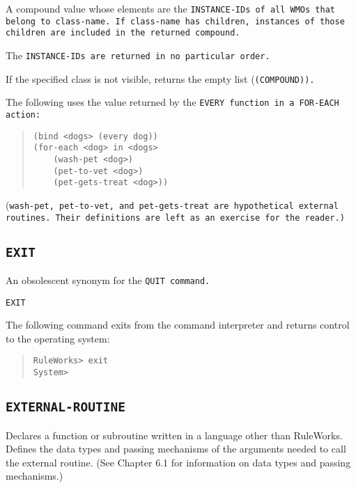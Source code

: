 \ReturnValue

A compound value whose elements are the \tt{INSTANCE-ID}s of all WMOs
that belong to class-name. If class-name has children, instances of
those children are included in the returned compound.

The \tt{INSTANCE-ID}s are returned in no particular order.

If the specified class is not visible, returns the empty list
(\tt{(COMPOUND)}).

\Example

The following uses the value returned by the \tt{EVERY} function
in a \tt{FOR-EACH} action:
\begin{quote}
\begin{verbatim}
(bind <dogs> (every dog))
(for-each <dog> in <dogs>
    (wash-pet <dog>)
    (pet-to-vet <dog>)
    (pet-gets-treat <dog>))
\end{verbatim}
\end{quote}

(\tt{wash-pet}, \tt{pet-to-vet}, and \tt{pet-gets-treat} are
hypothetical external routines. Their definitions are left as an
exercise for the reader.)

\subsection{\tt{EXIT}}

An obsolescent synonym for the \tt{QUIT} command.

\Format

\tt{EXIT}

\Example

The following command exits from the command interpreter and returns
control to the operating system:

\begin{quote}
\begin{verbatim}
RuleWorks> exit
System>
\end{verbatim}
\end{quote}

\subsection{\tt{EXTERNAL-ROUTINE}}

Declares a function or subroutine written in a language other than
RuleWorks. Defines the data types and passing mechanisms of the
arguments needed to call the external routine. (See Chapter 6.1 for
information on data types and passing mechanisms.)

